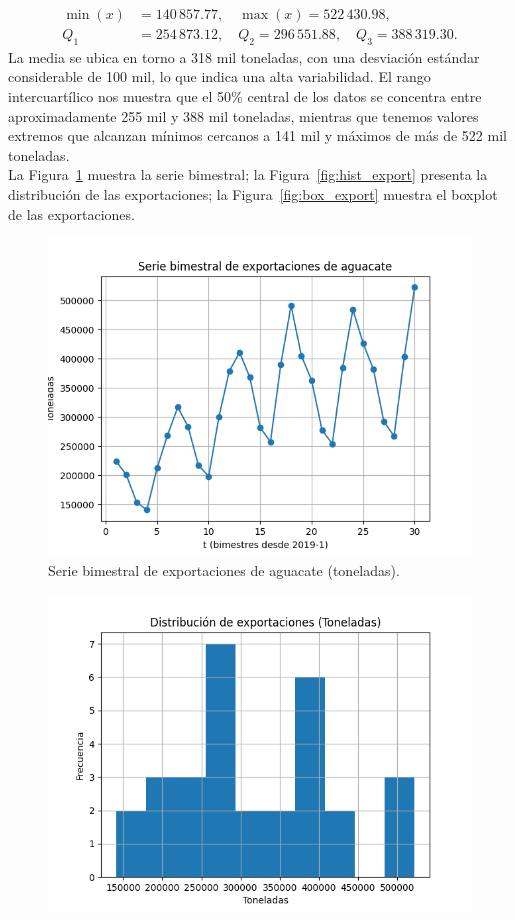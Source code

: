 \documentclass[10pt]{article}
\begin{document}
\begin{enumerate}
{\begin{align}
        \min(x) &= 140\,857.77, \quad \max(x) = 522\,430.98,\\
        Q_1 &= 254\,873.12, \quad Q_2 = 296\,551.88, \quad Q_3 = 388\,319.30.
      \end{align}
      \noindent La media se ubica en torno a 318 mil toneladas, con una desviación estándar considerable de 100 mil, lo que indica una alta variabilidad. El rango intercuartílico nos muestra que el 50\% central de los datos se concentra entre aproximadamente 255 mil y 388 mil toneladas, mientras que tenemos valores extremos que alcanzan mínimos cercanos a 141 mil y máximos de más de 522 mil toneladas.\\
      La Figura~\ref{fig:serie_bimestral} muestra la serie bimestral; la Figura~\ref{fig:hist_export} presenta la distribución de las exportaciones; la Figura~\ref{fig:box_export} muestra el boxplot de las exportaciones.
        \begin{figure}[H]
          \centering
          \includegraphics[width=0.65\linewidth]{../plots/python/avocado_exports_bimestral.png}
          \caption{Serie bimestral de exportaciones de aguacate (toneladas).}
          \label{fig:serie_bimestral}
        \end{figure}
        \begin{figure}[H]
            \centering
            \includegraphics[width=0.80\linewidth]{../plots/python/avocado_exports_histogram.png}

\end{figure}}
\end{enumerate}
\end{document}
